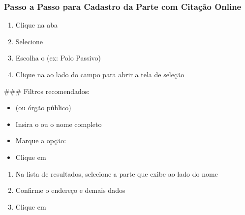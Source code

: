\documentclass[letterpaper,10pt,brazil]{sphinxmanual}
\begin{document}
\subsubsection{Passo a Passo para Cadastro da Parte com Citação Online}
\label{\detokenize{projud_24_cadastropartecitacaoonline:passo-a-passo-para-cadastro-da-parte-com-citacao-online}}\begin{enumerate}
%
\item {} 
\sphinxAtStartPar
Clique na aba 

\item {} 
\sphinxAtStartPar
Selecione 

\item {} 
\sphinxAtStartPar
Escolha o  (ex: Polo Passivo)

\item {} 
\sphinxAtStartPar
Clique na  ao lado do campo  para abrir a tela de seleção

\end{enumerate}

\sphinxAtStartPar
\#\#\# Filtros recomendados:
\begin{itemize}
\item {} 
\sphinxAtStartPar
{} (ou órgão público)

\item {} 
\sphinxAtStartPar
Insira o  ou o nome completo

\item {} 
\sphinxAtStartPar
Marque a opção: 

\item {} 
\sphinxAtStartPar
Clique em 

\end{itemize}
\begin{enumerate}
%
\setcounter{enumi}{4}
\item {} 
\sphinxAtStartPar
Na lista de resultados, selecione a parte que exibe  ao lado do nome

\item {} 
\sphinxAtStartPar
Confirme o endereço e demais dados

\item {} 
\sphinxAtStartPar
Clique em 

\end{enumerate}
\end{document}
